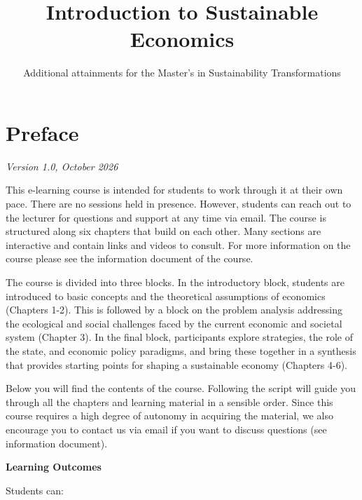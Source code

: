\documentclass[
  british,
  a4paper,
  DIV=11,
  numbers=noendperiod,
  oneside,
  openany]{scrreprt}
\title{Introduction to Sustainable Economics}
\subtitle{Additional attainments for the Master's in Sustainability
Transformations}
\author{}
\date{}
\renewcommand*\contentsname{Table of contents}
\newcommand\contentsname{Table of contents}
\begin{document}
\maketitle

\renewcommand*\contentsname{Table of contents}
{
\setcounter{tocdepth}{2}
\tableofcontents
}


\chapter*{Preface}\label{preface}


\emph{Version 1.0, October 2026}

This e-learning course is intended for students to work through it at
their own pace. There are no sessions held in presence. However,
students can reach out to the lecturer for questions and support at any
time via email. The course is structured along six chapters that build
on each other. Many sections are interactive and contain links and
videos to consult. For more information on the course please see the
information document of the course.

The course is divided into three blocks. In the introductory block,
students are introduced to basic concepts and the theoretical
assumptions of economics (Chapters 1-2). This is followed by a block on
the problem analysis addressing the ecological and social challenges
faced by the current economic and societal system (Chapter 3). In the
final block, participants explore strategies, the role of the state, and
economic policy paradigms, and bring these together in a synthesis that
provides starting points for shaping a sustainable economy (Chapters
4-6).

Below you will find the contents of the course. Following the script
will guide you through all the chapters and learning material in a
sensible order. Since this course requires a high degree of autonomy in
acquiring the material, we also encourage you to contact us via email if
you want to discuss questions (see information document).

\textbf{Learning Outcomes}

Students can:
\end{document}
